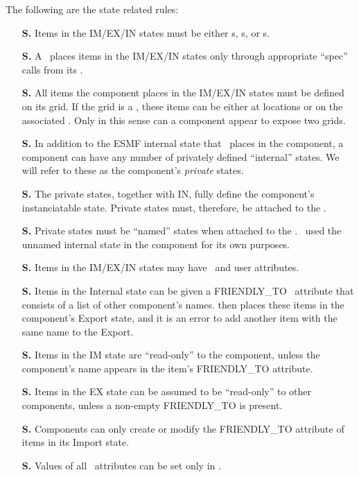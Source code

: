 The following are the state related rules:
%
\begin{itemize}
\item[{\bf S.\thegenct}] Items in  the IM/EX/IN states must be either
  \stt s, \bdl s, or  \fld s.
\addtocounter{genct}{1}
%
\item[{\bf S.\thegenct}] A \ggn\  places items in the IM/EX/IN states only 
  through appropriate ``spec'' calls from its \ssv.
\addtocounter{genct}{1}
%
\item[{\bf S.\thegenct}] All items the component places in the IM/EX/IN states
  must be defined on its grid. If the grid is a \loc, these items
  can be either at locations or on the associated \grd. Only in this sense
  can a component appear to expose two grids. 
\addtocounter{genct}{1}
%
\item[{\bf S.\thegenct}] In addition to the ESMF internal state that \ggn\ 
  places in the component, a component can have any number of privately 
  defined ``internal'' states. We will refer to these as the component's 
  {\em private} states.
\addtocounter{genct}{1}
%
\item[{\bf S.\thegenct}] The private states, together with IN, fully define the
  component's instanciatable state. Private states must, therefore, be
  attached to the \egc.
\addtocounter{genct}{1}
%
\item[{\bf S.\thegenct}] Private states must be ``named'' states when attached
  to the \egc. \ggn\  used the unnamed internal state in the component for its
  own purposes.
\addtocounter{genct}{1}
%
\item[{\bf S.\thegenct}] Items in the IM/EX/IN states may have \ggn\  and
  user attributes. 
\addtocounter{genct}{1}
%
\item[{\bf S.\thegenct}] Items in the Internal state can be given a
  FRIENDLY\_TO \ggn\  attribute that consists of a list of other
  component's names. \ggn  then places these items in the component's
  Export state, and it is an error to add another item with the same name
  to the Export.  
\addtocounter{genct}{1}
%
\item[{\bf S.\thegenct}] Items in the IM state are ``read-only'' to the
  component, unless the component's name appears in the item's FRIENDLY\_TO
  attribute.
\addtocounter{genct}{1}
%
\item[{\bf S.\thegenct}] Items in the EX state can be assumed to be
  ``read-only'' to  other components, unless a non-empty FRIENDLY\_TO
   is present.
\addtocounter{genct}{1}
%
\item[{\bf S.\thegenct}] Components can only create or modify the FRIENDLY\_TO
  attribute of items in its Import state.
\addtocounter{genct}{1}
%
\item[{\bf S.\thegenct}] Values of all \ggn\  attributes can be set only
  in \ssv.
\addtocounter{genct}{1}
%
\end{itemize}

